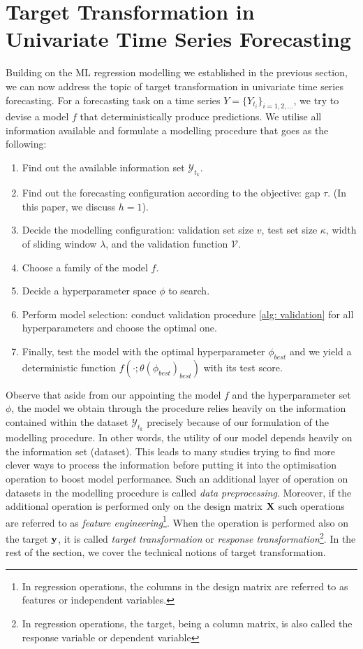 \section{Target Transformation in Univariate Time Series Forecasting}

Building on the ML regression modelling we established in the previous section, we can now address the topic of target transformation in univariate time series forecasting. For a forecasting task on a time series $Y = \{ Y_{t_i} \}_{i = 1, 2, \ldots}$, we try to devise a model $f$ that deterministically produce predictions. We utilise all information available and formulate a modelling procedure that goes as the following:
\begin{enumerate}
    \item Find out the available information set $\mathcal{Y}_{t_k}$.
    \item Find out the forecasting configuration according to the objective: gap $\tau$. (In this paper, we discuss $h=1$).
    \item Decide the modelling configuration: validation set size $v$, test set size $\kappa$, width of sliding window $\lambda$, and the validation function $\mathcal{V}$.
    \item Choose a family of the model $f$.
    \item Decide a hyperparameter space $\phi$ to search.
    \item Perform model selection: conduct validation procedure \ref{alg: validation} for all hyperparameters and choose the optimal one.
    \item Finally, test the model with the optimal hyperparameter $\phi_{best}$ and we yield a deterministic function $f(\cdot;\theta(\phi_{best})_{best})$ with its test score.
\end{enumerate}
Observe that aside from our appointing the model $f$ and the hyperparameter set $\phi$, the model we obtain through the procedure relies heavily on the information contained within the dataset $\mathcal{Y}_{t_k}$ precisely because of our formulation of the modelling procedure. In other words, the utility of our model depends heavily on the information set (dataset). This leads to many studies trying to find more clever ways to process the information before putting it into the optimisation operation to boost model performance. Such an additional layer of operation on datasets in the modelling procedure is called \textit{data preprocessing}. Moreover, if the additional operation is performed only on the design matrix $\mathbf{X}$ such operations are referred to as \textit{feature engineering}\footnote{In regression operations, the columns in the design matrix are referred to as features or independent variables.}. When the operation is performed also on the target $\mathbf{y}$, it is called \textit{target transformation} or \textit{response transformation}\footnote{In regression operations, the target, being a column matrix, is also called the response variable or dependent variable}. In the rest of the section, we cover the technical notions of target transformation.

